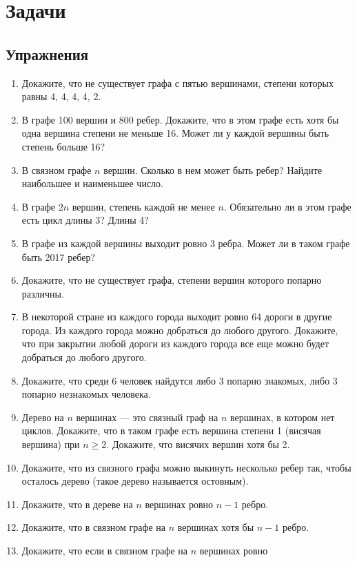 \section{Задачи}
\subsection{Упражнения}
\begin{enumerate}
    \item Докажите, что не существует графа с пятью вершинами, степени
        которых равны 4, 4, 4, 4, 2.
    \item В графе 100 вершин и 800 ребер. Докажите, что в этом графе
        есть хотя бы одна вершина степени не меньше 16. Может ли у
        каждой вершины быть степень больше 16?
    \item В связном графе $n$ вершин. Сколько в нем может быть ребер?
        Найдите наибольшее и наименьшее число.
    \item В графе $2n$ вершин, степень каждой не менее $n$. Обязательно
        ли в этом графе есть цикл длины 3? Длины 4?
    \item В графе из каждой вершины выходит ровно 3 ребра. Может ли в
        таком графе быть 2017 ребер?
    \item Докажите, что не существует графа, степени вершин которого
        попарно различны.
    \item В некоторой стране из каждого города выходит ровно 64 дороги
        в другие города. Из каждого города можно добраться до любого
        другого. Докажите, что при закрытии любой дороги из каждого
        города все еще можно будет добраться до любого другого.
    \item Докажите, что среди 6 человек найдутся либо 3 попарно
        знакомых, либо 3 попарно незнакомых человека.
    \item Дерево на $n$ вершинах --- это связный граф на $n$ вершинах,
        в котором нет циклов. Докажите, что в таком графе есть
        вершина степени 1 (висячая вершина) при $n \geqslant 2$.
        Докажите, что висячих вершин хотя бы 2.
    \item Докажите, что из связного графа можно выкинуть несколько
        ребер так, чтобы осталось дерево (такое дерево называется
        остовным).
    \item Докажите, что в дереве на $n$ вершинах ровно $n-1$ ребро.
    \item Докажите, что в связном графе на $n$ вершинах хотя бы
        $n-1$ ребро.
    \item Докажите, что если в связном графе на $n$ вершинах ровно

\end{enumerate}
